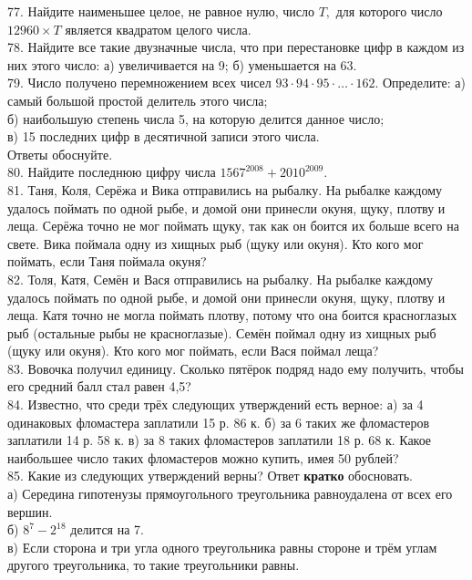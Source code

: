 77. Найдите наименьшее целое, не равное нулю, число $T,$ для которого число $12960\times T$ является квадратом целого числа.\\
78. Найдите все такие двузначные числа, что при перестановке цифр в каждом из них этого число: а) увеличивается на 9; б) уменьшается на 63.\\
79. Число получено перемножением всех чисел $93\cdot94\cdot95\cdot\ldots\cdot162.$ Определите:
а) самый большой простой делитель этого числа;\\
б) наибольшую степень числа 5, на которую делится данное число;\\
в) 15 последних цифр в десятичной записи этого числа.\\
Ответы обоснуйте.\\
80. Найдите последнюю цифру числа $1567^{2008}+2010^{2009}.$\\
81. Таня, Коля, Серёжа и Вика отправились на рыбалку. На рыбалке каждому удалось поймать по одной рыбе, и домой они принесли окуня, щуку, плотву и леща. Серёжа точно не мог поймать щуку, так как он боится их больше всего на свете. Вика поймала одну из хищных рыб (щуку или окуня). Кто кого мог поймать, если Таня поймала окуня?\\
82. Толя, Катя, Семён и Вася отправились на рыбалку. На рыбалке каждому удалось поймать по одной рыбе, и домой они принесли окуня, щуку, плотву и леща. Катя точно не могла поймать плотву, потому что она боится красноглазых рыб (остальные рыбы не красноглазые). Семён поймал одну из хищных рыб (щуку или окуня). Кто кого мог поймать, если Вася поймал леща?\\
83. Вовочка получил единицу. Сколько пятёрок подряд надо ему получить, чтобы его средний балл стал равен 4,5?\\
84. Известно, что среди трёх следующих утверждений есть верное: а) за 4 одинаковых фломастера заплатили 15 р. 86 к. б) за 6 таких же фломастеров заплатили 14 р. 58 к. в) за 8 таких фломастеров заплатили 18 р. 68 к. Какое наибольшее число таких фломастеров можно купить, имея 50 рублей?\\
85. Какие из следующих утверждений верны? Ответ {\bf кратко} обосновать.\\
а) Середина гипотенузы прямоугольного треугольника равноудалена от всех его вершин.\\
б) $8^7-2^{18}$ делится на 7.\\
в) Если сторона и три угла одного треугольника равны стороне и трём углам другого треугольника, то такие треугольники равны.\\
